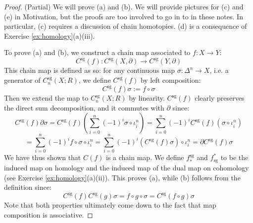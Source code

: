 \documentclass[12pt]{article}
\theoremstyle{definition}
\numberwithin{equation}{section}
\newcommand{\op}{\operatorname}
\begin{document}
\begin{proof} (Partial) We will prove (a) and (b). We will provide pictures for (c) and (e) in Motivation, but the proofs are too involved to go in to in these notes. In particular, (c) requires a discussion of chain homotopies. (d) is a consequence of Exercise \ref{ex:homology}(a)(iii).

To prove (a) and (b), we construct a chain map associated to $f:X \to Y$:
\[C^{\op{sg}}(f):C^{\op{sg}}(X,\partial) \to C^{\op{sg}}(Y,\partial)\]
This chain map is defined as so: for any continuous map $\sigma:\Delta^n \to X$, i.e. a generator of $C^{\op{sg}}_n(X;R)$, we define $C^{\op{sg}}(f)$ by left composition:
\[C^{\op{sg}}(f)\sigma := f \circ \sigma\]
Then we extend the map to $C^{\op{sg}}_n(X;R)$ by linearity. $C^{\op{sg}}(f)$ clearly preserves the direct sum decomposition, and it commutes with $\partial$ since:
\[
C^{\op{sg}}(f)\partial\sigma = C^{\op{sg}}(f)(\sum_{i=0}^n (-1)^i \sigma \circ \iota^n_i) = \sum_{i=0}^n (-1)^i C^{\op{sg}}(f)(\sigma \circ \iota^n_i)
\]
\[
 = \sum_{i=0}^n (-1)^i f \circ \sigma \circ \iota^n_i = \sum_{i=0}^n (-1)^i (C^{\op{sg}}(f)\sigma) \circ \iota^n_i = \partial C^{\op{sg}}(f)\sigma
\]
We have thus shown that $C(f)$ is a chain map. We define $f^{\op{sg}}_*$ and $f_{\op{sg}}^*$ to be the induced map on homology and the induced map of the dual map on cohomology (see Exercise \ref{ex:homology}(a)(ii)). This proves (a), while (b) follows from the definition since:
\[
C^{\op{sg}}(f)C^{\op{sg}}(g)\sigma = f \circ g \circ \sigma = C^{\op{sg}}(f \circ g)\sigma
\]
Note that both properties ultimately come down to the fact that map composition is associative. \end{proof}
\end{document}
